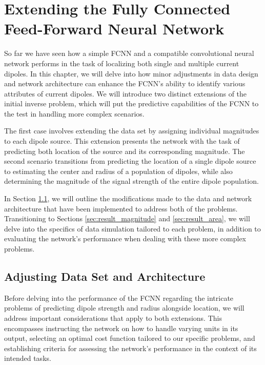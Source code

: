 \documentclass[a4paper, UKenglish, 11pt]{uiomaster}
\begin{document}
\chapter{Extending the Fully Connected Feed-Forward Neural Network} \label{chap:extended_FCNN}

So far we have seen how a simple FCNN and a compatible convolutional neural network performs in the task of localizing both single and multiple current dipoles. In this chapter, we will delve into how minor adjustments in data design and network architecture can enhance the FCNN's ability to identify various attributes of current dipoles. We will introduce two distinct extensions of the initial inverse problem, which will put the predictive capabilities of the FCNN to the test in handling more complex scenarios.

The first case involves extending the data set by assigning individual magnitudes to each dipole source. This extension presents the network with the task of predicting both location of the source and its corresponding magnitude. The second scenario transitions from predicting the location of a single dipole source to estimating the center and radius of a population of dipoles, while also determining the magnitude of the signal strength of the entire dipole population.

In Section \ref{sec:method}, we will outline the modifications made to the data and network architecture that have been implemented to address both of the problems. Transitioning to Sections \ref{sec:result_magnitude} and \ref{sec:result_area}, we will delve into the specifics of data simulation tailored to each problem, in addition to evaluating the network's performance when dealing with these more complex problems.






\section{Adjusting Data Set and Architecture} \label{sec:method}
Before delving into the performance of the FCNN regarding the intricate problems of predicting dipole strength and radius alongside location, we will address important considerations that apply to both extensions. This encompasses instructing the network on how to handle varying units in its output, selecting an optimal cost function tailored to our specific problems, and establishing criteria for assessing the network's performance in the context of its intended tasks.
\end{document}
